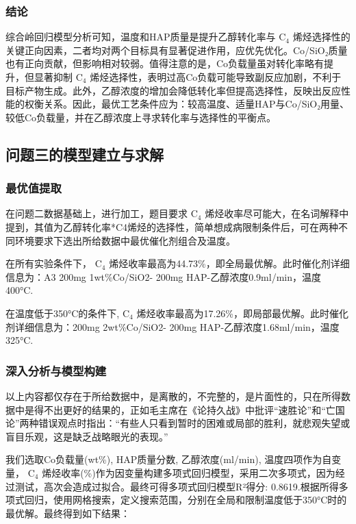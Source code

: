 \newpage


\subsubsection{结论}	
综合岭回归模型分析可知，温度和HAP质量是提升乙醇转化率与 \( \text{C}_4 \) 烯烃选择性的关键正向因素，二者均对两个目标具有显著促进作用，应优先优化。Co/SiO₂质量也有正向贡献，但影响相对较弱。值得注意的是，Co负载量虽对转化率略有提升，但显著抑制 \( \text{C}_4 \) 烯烃选择性，表明过高Co负载可能导致副反应加剧，不利于目标产物生成。此外，乙醇浓度的增加会降低转化率但提高选择性，反映出反应性能的权衡关系。因此，最优工艺条件应为：较高温度、适量HAP与Co/SiO₂用量、较低Co负载量，并在乙醇浓度上寻求转化率与选择性的平衡点。





\subsection{问题三的模型建立与求解}



\subsubsection{最优值提取}

在问题二数据基础上，进行加工，题目要求 \( \text{C}_4 \) 烯烃收率尽可能大，在名词解释中提到，其值为乙醇转化率*C4烯烃的选择性，简单想成病限制条件后，可在两种不同环境要求下选出所给数据中最优催化剂组合及温度。

在所有实验条件下， \( \text{C}_4 \) 烯烃收率最高为44.73\%，即全局最优解。此时催化剂详细信息为：A3 200mg 1wt\%Co/SiO2- 200mg HAP-乙醇浓度0.9ml/min，温度 400°C.

在温度低于350°C的条件下, \( \text{C}_4 \) 烯烃收率最高为17.26\%，即局部最优解。此时催化剂详细信息为：200mg 2wt\%Co/SiO2- 200mg HAP-乙醇浓度1.68ml/min，温度 325°C.


\subsubsection{深入分析与模型构建}
以上内容都仅存在于所给数据中，是离散的，不完整的，是片面性的，只在所得数据中是得不出更好的结果的，正如毛主席在《论持久战》中批评“速胜论”和“亡国论”两种错误观点时指出：“有些人只看到暂时的困难或局部的胜利，就悲观失望或盲目乐观，这是缺乏战略眼光的表现。”

我们选取Co负载量(wt\%), HAP质量分数, 乙醇浓度(ml/min), 温度四项作为自变量， \( \text{C}_4 \) 烯烃收率(\%)作为因变量构建多项式回归模型，采用二次多项式，因为经过测试，高次会造成过拟合。最终可得多项式回归模型R²得分: 0.8619.根据所得多项式回归，使用网格搜索，定义搜索范围，分别在全局和限制温度低于350°C时的最优解。最终得到如下结果：

